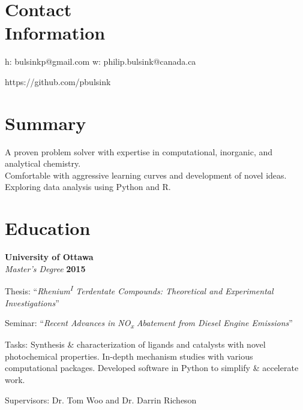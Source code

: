 \documentclass[margin,line]{resume}
\begin{document}
\thispagestyle{plain}
\begin{resume}

    \section{\mysidestyle Contact\\Information}
        
    h: bulsinkp@gmail.com \hspace{60mm} w: philip.bulsink@canada.ca
\vspace{-4.5mm}
    
    https://github.com/pbulsink
    \\\vspace{-4.5mm}


    \section{\mysidestyle Summary}

    A proven problem solver with expertise in computational, inorganic, and analytical chemistry.\\ Comfortable with aggressive learning curves and development of novel ideas.\\ Exploring data analysis using Python and R.


    \section{\mysidestyle Education}

    \textbf{University of Ottawa}\\\vspace{1mm}%
    \textsl{Master's Degree} \hfill \textbf{2015}\vspace{-3mm}\\\vspace{-1mm}%
    \begin{list2}
        \item Thesis: ``\textit{Rhenium\textsuperscript{I} Terdentate Compounds: Theoretical and Experimental Investigations}''
        \item Seminar: ``\textit{Recent Advances in NO\textsubscript{x} Abatement from Diesel Engine Emissions}''
        \item Tasks: Synthesis \& characterization of ligands and catalysts with novel photochemical properties.
        In-depth mechanism studies with various computational packages.
        Developed software in Python to simplify \& accelerate work.
        \item Supervisors: Dr. Tom Woo and Dr. Darrin Richeson
    \end{list2}


\end{resume}
\end{document}
